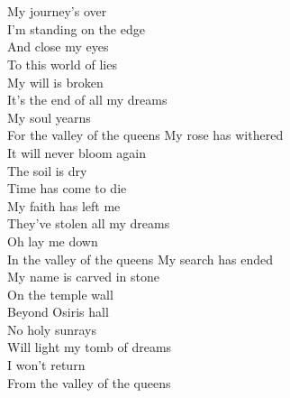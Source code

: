  \tab{}\tab{}\\
\tab{}\tab{}\\
My journey's over \tab{}\\
I'm standing on the edge\tab{}\\
And close my eyes\tab{}\\
To this world of lies\tab{}\\
My will is broken\tab{}\\
It's the end of all my dreams\tab{}\\
My soul yearns\tab{}\tab{}\\
For the valley of the queens\tab{}
\hops
My rose has withered\\
It will never bloom again\\
The soil is dry\\
Time has come to die\\
My faith has left me\\
They've stolen all my dreams\\
Oh lay me down\\
In the valley of the queens
\hops
My search has ended\\
My name is carved in stone\\
On the temple wall\\
Beyond Osiris hall\\
No holy sunrays\\
Will light my tomb of dreams\\
I won't return\\
From the valley of the queens